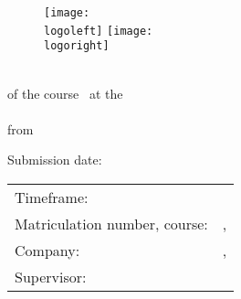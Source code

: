 \thispagestyle{empty}
\begin{titlepage}
	\enlargethispage{2.0cm}
	
	\begin{figure}
		\vspace*{-2cm}
		\texttt{[image: \\logoleft]}
		\hfill
		\texttt{[image: \\logoright]}\\[5ex]
	\end{figure}
	
	\vfill
	
	\begin{center}
		\begin{minipage}{\widthoftitle\textwidth}
			\centering
			\textsf{\huge{\textsc{\textbf{\MakeLowercase{\titleofwork}}}}}
		\end{minipage}
	\end{center}
	
	\vfill
	
	\begin{center}
		\Large{\textsc{\MakeLowercase{\typeofwork}}}\\[4ex]
		\large{of the course \courseofstudies~at the}\\[1ex]
		\large{\university}\\[4ex]
		\large{from}\\[1ex] 
		\large{\textbf{\authorofwork}}
		
	\end{center}
	
	\vfill
	
	\begin{center}
		Submission date:\\\dateofsubmission
	\end{center}
	
	\vfill
	
	\begin{flushleft}		
		\begin{tabular}{ll} %
			Timeframe: 			& \quad \periodoftime \\ 
			Matriculation number, course: 			& \quad \studentnumber , \nameofclass \\ 
			Company: 				& \quad \company, \companyheadquarter \\ 
			Supervisor:	& \quad \supervisor \\ 
		\end{tabular} 
	\end{flushleft}	
\end{titlepage}

